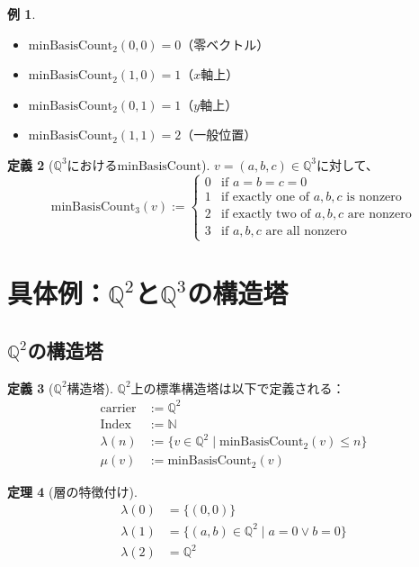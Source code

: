 \documentclass[a4paper,11pt]{ltjsarticle}
\theoremstyle{definition}
\newtheorem{definition}{定義}[section]
\newtheorem{theorem}[definition]{定理}
\newtheorem{example}[definition]{例}
\begin{document}
\begin{example}
\begin{itemize}
  \item $\mathrm{minBasisCount}_2(0, 0) = 0$（零ベクトル）
  \item $\mathrm{minBasisCount}_2(1, 0) = 1$（$x$軸上）
  \item $\mathrm{minBasisCount}_2(0, 1) = 1$（$y$軸上）
  \item $\mathrm{minBasisCount}_2(1, 1) = 2$（一般位置）
\end{itemize}
\end{example}

\begin{definition}[$\mathbb{Q}^3$における$\mathrm{minBasisCount}$]
$v = (a, b, c) \in \mathbb{Q}^3$に対して、
\[
\mathrm{minBasisCount}_3(v) := \begin{cases}
0 & \text{if } a = b = c = 0 \\
1 & \text{if exactly one of } a, b, c \text{ is nonzero} \\
2 & \text{if exactly two of } a, b, c \text{ are nonzero} \\
3 & \text{if } a, b, c \text{ are all nonzero}
\end{cases}
\]
\end{definition}

\section{具体例：$\mathbb{Q}^2$と$\mathbb{Q}^3$の構造塔}

\subsection{$\mathbb{Q}^2$の構造塔}

\begin{definition}[$\mathbb{Q}^2$構造塔]
$\mathbb{Q}^2$上の標準構造塔は以下で定義される：
\begin{align*}
\text{carrier} &:= \mathbb{Q}^2 \\
\text{Index} &:= \mathbb{N} \\
\lambda(n) &:= \{v \in \mathbb{Q}^2 \mid \mathrm{minBasisCount}_2(v) \leq n\} \\
\mu(v) &:= \mathrm{minBasisCount}_2(v)
\end{align*}
\end{definition}

\begin{theorem}[層の特徴付け]\label{thm:layer_char_2d}
\begin{align*}
\lambda(0) &= \{(0, 0)\} \\
\lambda(1) &= \{(a, b) \in \mathbb{Q}^2 \mid a = 0 \lor b = 0\} \\
\lambda(2) &= \mathbb{Q}^2
\end{align*}
\end{theorem}
\end{document}
